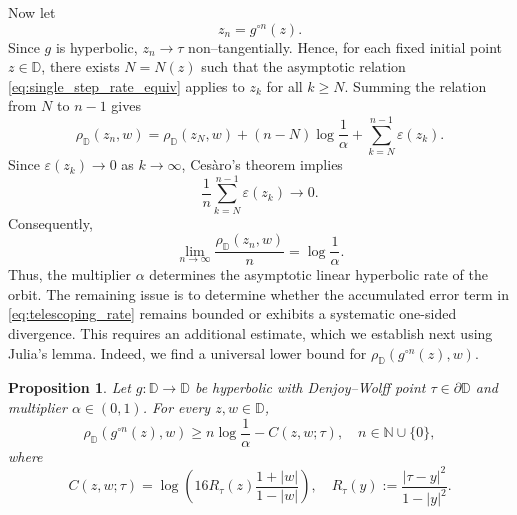 \documentclass[10pt,a4paper]{amsart}
\numberwithin{equation}{section}
\newtheorem{proposition}[equation]{Proposition}
\begin{document}
Now let
\begin{equation*}
z_n=g^{\circ n}(z).
\end{equation*}
Since $g$ is hyperbolic, $z_n\to\tau$ non--tangentially. Hence, for
each fixed initial point $z\in\mathbb{D}$, there exists $N=N(z)$ such
that the asymptotic relation \eqref{eq:single_step_rate_equiv} applies
to $z_k$ for all $k\geq N$. Summing the relation from $N$ to $n-1$ gives
\begin{equation}
\label{eq:telescoping_rate}
\rho_{\mathbb{D}}(z_n,w)
=
\rho_{\mathbb{D}}(z_N,w)
+
(n-N)\log\frac{1}{\alpha}
+
\sum_{k=N}^{n-1}\varepsilon(z_k).
\end{equation}
Since $\varepsilon(z_k)\to0$ as $k\to\infty$, Ces\`aro's theorem implies
\begin{equation*}
\frac{1}{n}
\sum_{k=N}^{n-1}\varepsilon(z_k)
\longrightarrow 0.
\end{equation*}
Consequently,
\begin{equation}
\label{eq:asymptotic_hyperbolic_rate}
\lim_{n\to\infty}
\frac{\rho_{\mathbb{D}}(z_n,w)}{n}
=
\log\frac{1}{\alpha}.
\end{equation}
Thus, the multiplier $\alpha$ determines the asymptotic linear
hyperbolic rate of the orbit. The remaining issue is to determine
whether the accumulated error term in \eqref{eq:telescoping_rate}
remains bounded or exhibits a systematic one-sided divergence. This
requires an additional estimate, which we establish next using
Julia's lemma. Indeed, we find a universal lower bound for $\rho_{\mathbb{D}}(g^{\circ n}(z),w)$.



\begin{proposition}\label{prop:julia-lower-bound}
Let $g:\mathbb{D}\to\mathbb{D}$ be hyperbolic with Denjoy--Wolff point
$\tau\in\partial\mathbb{D}$ and multiplier $\alpha\in(0,1)$. For every
$z,w\in\mathbb{D}$,
\begin{equation}
\label{eq:julia-lower-bound}
\rho_{\mathbb{D}}(g^{\circ n}(z),w)
\ge
n\log\frac{1}{\alpha}
-
C(z,w;\tau),
\quad n\in\mathbb{N}\cup\{0\},
\end{equation}
where
\begin{equation*}
C(z,w;\tau)
=
\log\left(
16R_\tau(z)\frac{1+|w|}{1-|w|}
\right),
\quad
R_\tau(y):=
\frac{|\tau-y|^2}{1-|y|^2}.
\end{equation*}
\end{proposition}
\end{document}
